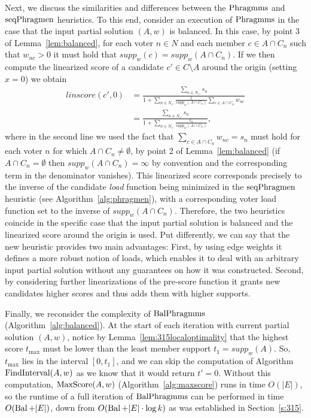 Next, we discuss the similarities and differences between the $\operatorname{Phragmms}$ and $\operatorname{seqPhragmen}$ heuristics. 
To this end, consider an execution of $\operatorname{Phragmms}$ in the case that the input partial solution $(A,w)$ is balanced. 
In this case, by point 3 of Lemma~\ref{lem:balanced}, for each voter $n\in N$ and each member $c\in A\cap C_n$ such that $w_{nc}>0$ it must hold that $supp_w(c)=supp_w(A\cap C_n)$.  
If we then compute the linearized score of a candidate $c'\in C\setminus A$ around the origin (setting $x=0$) we obtain 
\begin{align*}
linscore(c',0)&=\frac{\sum_{n\in N_{c'}} s_n}
{1 + \sum_{n\in N_{c'}} \frac{1}{supp_w(A\cap C_n)} \sum_{c\in A\cap C_n} w_{nc}} \\
&=\frac{\sum_{n\in N_{c'}} s_n}{1 + \sum_{n\in N_{c'}} \frac{s_n}{supp_w(A\cap C_n)} },
\end{align*}
where in the second line we used the fact that $\sum_{c\in A\cap C_n} w_{nc}=s_n$ must hold for each voter $n$ for which $A\cap C_n\neq \emptyset$, by point 2 of Lemma~\ref{lem:balanced} (if $A\cap C_n=\emptyset$ then $supp_w(A\cap C_n)=\infty$ by convention and the corresponding term in the denominator vanishes). 
This linearized score corresponds precisely to the inverse of the candidate \emph{load} function being minimized in the $\operatorname{seqPhragmen}$ heuristic (see Algorithm~\ref{alg:phragmen}), with a corresponding voter load function set to the inverse of $supp_w(A\cap C_n)$. 
Therefore, the two heuristics coincide in the specific case that the input partial solution is balanced and the linearized score around the origin is used. 
Put differently, we can say that the new heuristic provides two main advantages: 
First, by using edge weights it defines a more robust notion of loads, which enables it to deal with an arbitrary input partial solution without any guarantees on how it was constructed. 
Second, by considering further linearizations of the pre-score function it grants new candidates higher scores and thus adds them with higher supports.

Finally, we reconsider the complexity of $\operatorname{BalPhragmms}$ (Algorithm~\ref{alg:balanced}). 
At the start of each iteration with current partial solution $(A,w)$, notice by Lemma~\ref{lem:315localoptimality} that the highest score $t_{\max}$ must be lower than the least member support $t_1=supp_w(A)$. So, $t_{\max}$ lies in the interval $[0, t_1]$, and we can skip the computation of Algorithm $\operatorname{FindInterval}(A,w)$ as we know that it would return $t'=0$. 
Without this computation, $\operatorname{MaxScore}(A,w)$ (Algorithm~\ref{alg:maxscore}) runs in time $O(|E|)$, so the runtime of a full iteration of $\operatorname{BalPhragmms}$ can be performed in time $O(\operatorname{Bal} + |E|)$, down from $O(\operatorname{Bal} + |E|\cdot \log k)$ as was established in Section~\ref{s:315}.
